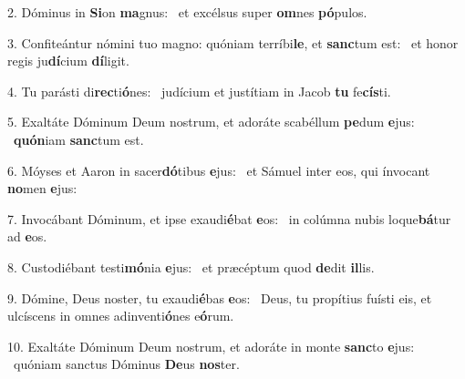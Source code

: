 2. Dóminus in \textbf{Si}on \textbf{ma}gnus: \ast\  et excélsus super \textbf{om}nes \textbf{pó}pulos.\

3. Confiteántur nómini tuo magno: quóniam terríbi\textbf{le}, et \textbf{sanc}tum est: \ast\  et honor regis ju\textbf{dí}cium \textbf{dí}ligit.\

4. Tu parásti di\textbf{rec}ti\textbf{ó}nes: \ast\  judícium et justítiam in Jacob \textbf{tu} fe\textbf{cís}ti.\

5. Exaltáte Dóminum Deum nostrum, et adoráte scabéllum \textbf{pe}dum \textbf{e}jus: \ast\  \textbf{quón}iam \textbf{sanc}tum est.\

6. Móyses et Aaron in sacer\textbf{dó}tibus \textbf{e}jus: \ast\  et Sámuel inter eos, qui ínvocant \textbf{no}men \textbf{e}jus:\

7. Invocábant Dóminum, et ipse exaudi\textbf{é}bat \textbf{e}os: \ast\  in colúmna nubis loque\textbf{bá}tur ad \textbf{e}os.\

8. Custodiébant testi\textbf{mó}nia \textbf{e}jus: \ast\  et præcéptum quod \textbf{de}dit \textbf{il}lis.\

9. Dómine, Deus noster, tu exaudi\textbf{é}bas \textbf{e}os: \ast\  Deus, tu propítius fuísti eis, et ulcíscens in omnes adinventi\textbf{ó}nes e\textbf{ó}rum.\

10. Exaltáte Dóminum Deum nostrum, et adoráte in monte \textbf{sanc}to \textbf{e}jus: \ast\  quóniam sanctus Dóminus \textbf{De}us \textbf{nos}ter.\

